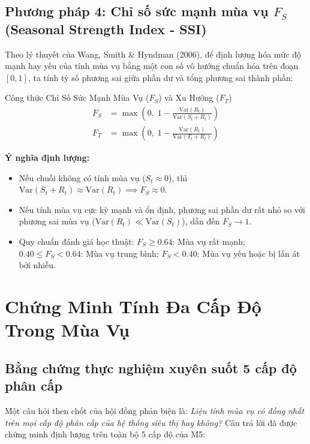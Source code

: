 \documentclass[12pt,a4paper,oneside]{article}
\begin{document}
\subsection{Phương pháp 4: Chỉ số sức mạnh mùa vụ \texorpdfstring{$F_S$}{Fs} (Seasonal Strength Index - SSI)}
Theo lý thuyết của Wang, Smith \& Hyndman (2006), để định lượng hóa mức độ mạnh hay yếu của tính mùa vụ bằng một con số vô hướng chuẩn hóa trên đoạn $[0, 1]$, ta tính tỷ số phương sai giữa phần dư và tổng phương sai thành phần:
\begin{mathformal}{Công thức Chỉ Số Sức Mạnh Mùa Vụ ($F_S$) và Xu Hướng ($F_T$)}
    \begin{align}
        F_S &= \max\left(0, \; 1 - \frac{\mathrm{Var}(R_t)}{\mathrm{Var}(S_t + R_t)}\right) \label{eq:ssi} \\
        F_T &= \max\left(0, \; 1 - \frac{\mathrm{Var}(R_t)}{\mathrm{Var}(T_t + R_t)}\right) \label{eq:tsi}
    \end{align}
\end{mathformal}
\textbf{Ý nghĩa định lượng:}
\begin{itemize}
    \item Nếu chuỗi không có tính mùa vụ ($S_t \approx 0$), thì $\mathrm{Var}(S_t + R_t) \approx \mathrm{Var}(R_t) \implies F_S \approx 0$.
    \item Nếu tính mùa vụ cực kỳ mạnh và ổn định, phương sai phần dư rất nhỏ so với phương sai mùa vụ ($\mathrm{Var}(R_t) \ll \mathrm{Var}(S_t)$), dẫn đến $F_S \to 1$.
    \item Quy chuẩn đánh giá học thuật: $F_S \ge 0.64$: Mùa vụ rất mạnh; $0.40 \le F_S < 0.64$: Mùa vụ trung bình; $F_S < 0.40$: Mùa vụ yếu hoặc bị lấn át bởi nhiễu.
\end{itemize}

\section[Chứng Minh Tính Đa Cấp Độ (Hierarchical Seasonality)]{Chứng Minh Tính Đa Cấp Độ Trong Mùa Vụ}

\subsection{Bằng chứng thực nghiệm xuyên suốt 5 cấp độ phân cấp}
Một câu hỏi then chốt của hội đồng phản biện là: \textit{Liệu tính mùa vụ có đồng nhất trên mọi cấp độ phân cấp của hệ thống siêu thị hay không?} Câu trả lời đã được chứng minh định lượng trên toàn bộ 5 cấp độ của M5:
\end{document}
